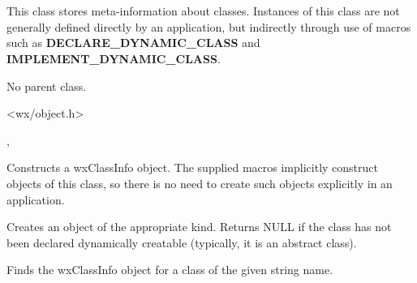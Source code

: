 \section{}\label{wxclassinfo}

This class stores meta-information about classes. Instances of this class are
not generally defined directly by an application, but indirectly through use
of macros such as {\bf DECLARE\_DYNAMIC\_CLASS} and {\bf IMPLEMENT\_DYNAMIC\_CLASS}.


No parent class.


<wx/object.h>




, 


\label{wxclassinfoctor}


Constructs a wxClassInfo object. The supplied macros implicitly construct objects of this
class, so there is no need to create such objects explicitly in an application.

\label{wxclassinfocreateobject}


Creates an object of the appropriate kind. Returns NULL if the class has not been declared
dynamically creatable (typically, it is an abstract class).

\label{wxclassinfofindclass}


Finds the wxClassInfo object for a class of the given string name.

\label{wxclassinfogetbaseclassname1}


